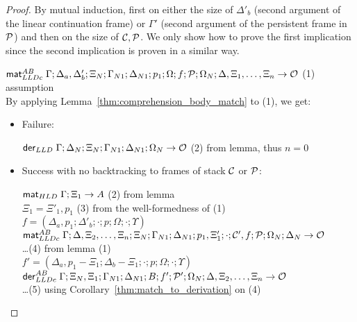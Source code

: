 \begin{proof}

By mutual induction, first on either the size of $\Delta'_b$ (second argument of
the linear continuation frame) or $\Gamma'$ (second argument of the
persistent frame in $\mathcal{P}$) and then on the size of $\mathcal{C},
\mathcal{P}$.  We only show how to prove the first implication since the
second implication is proven in a similar way.

$\mathsf{mat}_{LLDc}^{AB} \; \Gamma; \Delta_a, \Delta'_b; \Xi_N; \Gamma_{N1}; \Delta_{N1}; p_1;
\Omega; f; \mathcal{P}; \Omega_N; \Delta, \Xi_1, \dotsc, \Xi_n \rightarrow \mathcal{O}$ \hfill (1) assumption\\

By applying Lemma~\ref{thm:comprehension_body_match} to (1), we get:

\begin{itemize}[leftmargin=*]
   \item Failure:
   
   $\mathsf{der}_{LLD} \; \Gamma; \Delta_N; \Xi_N; \Gamma_{N1}; \Delta_{N1}; \Omega_N
   \rightarrow \mathcal{O}$ \hfill (2) from lemma, thus $n = 0$\\
   
   \item Success with no backtracking to frames of stack $\mathcal{C}$ or
   $\mathcal{P}$:
   
      $\mathsf{mat}_{HLD} \; \Gamma; \Xi_1 \rightarrow A$ \hfill (2) from lemma \\

      $\Xi_1 = \Xi'_1, p_1$ \hfill (3) from the well-formedness of (1) \\
      $f = (\Delta_a, p_1; \Delta'_b; \cdot; p; \Omega; \cdot; \Upsilon)$ \\

      $\mathsf{mat}_{LLDc}^{AB} \; \Gamma; \Delta, \Xi_2, \dotsc, \Xi_n; \Xi_N; \Gamma_{N1};
            \Delta_{N1}; p_1, \Xi'_1; \cdot; \mathcal{C'}, f; \mathcal{P}; \Omega_N; \Delta_N \rightarrow
            \mathcal{O}$ \\
      \dots \hfill (4) from lemma (1) \\

      $f' = (\Delta_a, p_1 - \Xi_1; \Delta_b - \Xi_1; \cdot; p; \Omega; \cdot;
            \Upsilon)$ \\

      $\mathsf{der}_{LLDc}^{AB} \; \Gamma; \Xi_N, \Xi_1; \Gamma_{N1}; \Delta_{N1}; B; f';
      \mathcal{P'}; \Omega_N; \Delta, \Xi_2, \dotsc, \Xi_n \rightarrow \mathcal{O}$ \\
      \dots \hfill (5) using Corollary~\ref{thm:match_to_derivation} on (4) \\


\end{itemize}
\end{proof}
